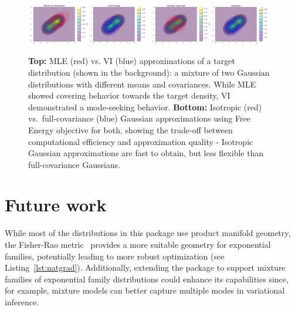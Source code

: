 \documentclass{juliacon}
\begin{document}


\begin{figure}[tb]
   \includegraphics[width=0.48\textwidth]{plots/comparison1.pdf}
   \includegraphics[width=0.48\textwidth]{plots/comparison2.pdf}
   \caption{\textbf{Top:} MLE (red) vs. VI (blue) approximations of a target distribution (shown in the background): a mixture of two Gaussian distributions with different means and covariances. While MLE showed covering behavior towards the target density, VI demonstrated a mode-seeking behavior. \textbf{Bottom:} Isotropic (red) vs.\ full-covariance (blue) Gaussian approximations using Free Energy objective for both, showing the trade-off between computational efficiency and approximation quality - Isotropic Gaussian approximations are fast to obtain, but less flexible than full-covariance Gaussians.}
   \label{fig:comparisons}
\end{figure}

\section{Future work}
While most of the distributions in this package use product manifold geometry, the Fisher-Rao metric~\cite{amari_natural_1998} provides a more suitable geometry for exponential families, potentially leading to more robust optimization (see Listing~\ref{lst:natgrad}). Additionally, extending the package to support mixture families of exponential family distributions could enhance its capabilities since, for example, mixture models can better capture multiple modes in variational inference.




\end{document}
